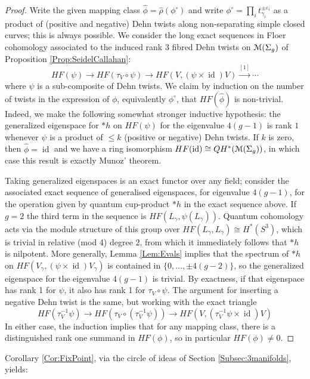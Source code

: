 \documentclass[reqno,10pt]{amsart}
\numberwithin{equation}{section}
\newcommand{\scrM}{\EuScript{M}}
\newcommand{\id}{\operatorname{id}}
\theoremstyle{remark}
\begin{document}
\begin{proof}
Write the given mapping class $\hat\phi=\hat\rho(\phi^{\circ})$ and write $\phi^{\circ}=\prod_i t_{\gamma_i}^{\pm \varepsilon_i}$ as a product of (positive and negative) Dehn twists along non-separating simple closed curves; this is always possible.  We consider the  long exact sequences in Floer cohomology associated to the induced rank 3 fibred Dehn twists on $\scrM(\Sigma_g)$ of Proposition \ref{Prop:SeidelCallahan}:
\[
HF(\psi) \rightarrow HF(\tau_V\circ\psi) \rightarrow HF(V, (\psi \times \id)V) \stackrel{[1]}{\longrightarrow} \cdots
\]
where $\psi$ is a sub-composite of Dehn twists.  We claim by induction on the number of twists in the expression of $\phi$, equivalently $\phi^{\circ}$, that $HF(\hat\phi)$ is non-trivial.  Indeed, we make the following somewhat stronger inductive hypothesis:  the generalized eigenspace for $\ast h$ on $HF(\psi)$ for the eigenvalue $4(g-1)$ is rank $1$ whenever $\psi$ is a product of $\leq k$ (positive or negative) Dehn twists.   If $k$ is zero, then $\hat\phi = \id$ and we have a ring isomorphism $HF(\id) \cong QH^*(\scrM(\Sigma_g))$, in which case this result is exactly Munoz' theorem.

Taking generalized eigenspaces is an exact functor over any field; consider the associated exact sequence of generalised eigenspaces, for eigenvalue $4(g-1)$, for the operation given by quantum cup-product $\ast h$ in the exact sequence above.  If $g=2$ the third term in the sequence is $HF(L_{\gamma}, \psi(L_{\gamma}))$.  Quantum cohomology acts via the module structure of this group over $HF(L_{\gamma},L_{\gamma}) \cong H^*(S^3)$, which is trivial in relative (mod 4) degree $2$, from which it immediately follows that $\ast h$ is nilpotent. More generally, Lemma \ref{Lem:Evals} implies that the spectrum of $\ast h$ on $HF(V_{\gamma}, (\psi\times\id)V_{\gamma})$ is contained in $\{0,\ldots,\pm 4(g-2)\}$, so the generalized eigenspace for the eigenvalue $4(g-1)$ is trivial.  By exactness, if that eigenspace has rank 1 for $\psi$, it also has rank 1 for $\tau_V\circ\psi$.
The argument for inserting a negative Dehn twist is the same, but working with the exact triangle
\[
HF(\tau_V^{-1} \psi) \rightarrow HF(\tau_V\circ(\tau_V^{-1}\psi)) \rightarrow HF(V,(\tau_V^{-1}\psi \times \id)V) 
\]
In either case, the induction implies that for any mapping class, there is a distinguished rank one summand in $HF(\phi)$, so in particular $HF(\phi)\neq 0$.
\end{proof}

Corollary \ref{Cor:FixPoint}, via the circle of ideas of Section \ref{Subsec:3manifolds}, yields:
\end{document}
